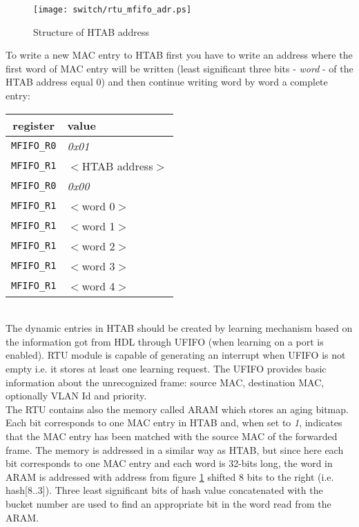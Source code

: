\begin{figure}[ht]
  \begin{center}
    \texttt{[image: switch/rtu\_mfifo\_adr.ps]}
  \end{center}
  \caption{Structure of HTAB address}
  \label{fig:rtu:htab_adr}
\end{figure}

To write a new MAC entry to HTAB first you have to write an address where the
first word of MAC entry will be written (least significant three bits -
\emph{word} - of the HTAB address equal 0) and then continue writing word by
word a complete entry:

\begin{tabular}{c|l}
  {\bf register} & {\bf value}\\
  \hline
  \texttt{MFIFO\_R0} & \emph{0x01}\\
  \texttt{MFIFO\_R1} & $<$HTAB address$>$\\
  \texttt{MFIFO\_R0} & \emph{0x00}\\
  \texttt{MFIFO\_R1} & $<$word 0$>$\\
  \texttt{MFIFO\_R1} & $<$word 1$>$\\
  \texttt{MFIFO\_R1} & $<$word 2$>$\\
  \texttt{MFIFO\_R1} & $<$word 3$>$\\
  \texttt{MFIFO\_R1} & $<$word 4$>$\\
\end{tabular}\\

The dynamic entries in HTAB should be created by learning mechanism based on the
information got from HDL through UFIFO (when learning on a port is enabled). RTU
module is capable of generating an interrupt when UFIFO is not empty i.e. it
stores at least one learning request. The UFIFO provides basic information
about the unrecognized frame: source MAC, destination MAC, optionally VLAN Id
and priority.\\

The RTU contains also the memory called ARAM which stores an aging bitmap. Each
bit corresponds to one MAC entry in HTAB and, when set to \emph{1}, indicates
that the MAC entry has been matched with the source MAC of the forwarded frame. The
memory is addressed in a similar way as HTAB, but since here each bit
corresponds to one MAC entry and each word is 32-bits long, the word in ARAM
is addressed with address from figure \ref{fig:rtu:htab_adr} shifted 8 bits to
the right (i.e. hash[8..3]). Three least significant bits of hash value
concatenated with the bucket number are used to find an appropriate bit in the word
read from the ARAM.\\

